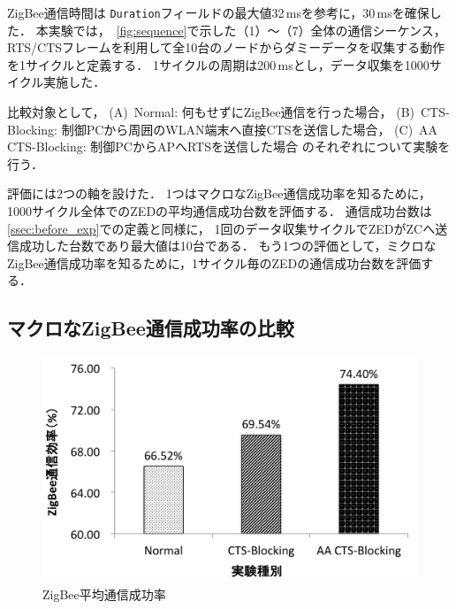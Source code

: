 \documentclass[technicalreport]{ieicej}
\begin{document}
ZigBee通信時間は
\texttt{Duration}フィールドの最大値32\,msを参考に，30\,msを確保した．
本実験では，\figurename~\ref{fig:sequence}で示した（1）〜（7）全体の通信シーケンス，
RTS/CTSフレームを利用して全10台のノードからダミーデータを収集する動作を1サイクルと定義する．
1サイクルの周期は200\,msとし，データ収集を1000サイクル実施した．%

比較対象として，
(A)~Normal: 何もせずにZigBee通信を行った場合，
(B)~CTS-Blocking: 制御PCから周囲のWLAN端末へ直接CTSを送信した場合，
(C)~AA CTS-Blocking: 制御PCからAPへRTSを送信した場合
のそれぞれについて実験を行う．

評価には2つの軸を設けた．
1つはマクロなZigBee通信成功率を知るために，1000サイクル全体でのZEDの平均通信成功台数を評価する．
通信成功台数は\ref{ssec:before_exp}での定義と同様に，
1回のデータ収集サイクルでZEDがZCへ送信成功した台数であり最大値は10台である．
もう1つの評価として，ミクロなZigBee通信成功率を知るために，1サイクル毎のZEDの通信成功台数を評価する．

\subsection{マクロなZigBee通信成功率の比較}
\label{sec:exp_result_all}

\begin{figure}[bt]
 \centering
 \includegraphics[width=\columnwidth]{figure/eff_all_zigbee.pdf}
 \caption{ZigBee平均通信成功率}
 \label{fig:eff_all_zigbee}
\end{figure}
\end{document}

